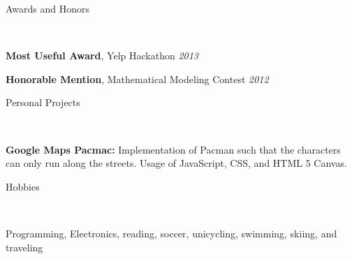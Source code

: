 \documentclass[9pt]{article}
\newenvironment{changemargin}[2]{%
  \begin{list}{}{%
    \setlength{\topsep}{0pt}%
    \setlength{\leftmargin}{#1}%
    \setlength{\rightmargin}{#2}%
    \setlength{\listparindent}{\parindent}%
    \setlength{\itemindent}{\parindent}%
    \setlength{\parsep}{\parskip}%
  }%
  \item[]}{\end{list}
}
\newcommand{\lineover}{
    \begin{changemargin}{-0.05in}{-0.05in}
        \vspace*{-8pt}
        \hrulefill \\
        \vspace*{-2pt}
    \end{changemargin}
}
\newcommand{\header}[1]{
    \begin{changemargin}{-0.5in}{-0.5in}
        {\large #1}\\
        \lineover
    \end{changemargin}
}
\newenvironment{body} {
    \vspace*{-16pt}
    \begin{changemargin}{-0.20in}{-0.5in}
  }
    {\end{changemargin}
}
\begin{document}
\smallskip


\header{Awards and Honors}

\begin{body}
    \vspace{14pt}

    \textbf{Most Useful Award}, Yelp Hackathon \hfill{} \emph{2013}\\
    \smallskip

    \textbf{Honorable Mention}, Mathematical Modeling Contest \hfill{} \emph{2012}\\

\end{body}
\smallskip


\header{Personal Projects}

\begin{body}
    \vspace{14pt}
    \textbf{Google Maps Pacmac:} Implementation of Pacman such that the characters can only run along the streets.  Usage of JavaScript, CSS, and HTML 5 Canvas.

\end{body}
\smallskip


\header{Hobbies}

\begin{body}
    \vspace{14pt}
    Programming, Electronics, reading, soccer, unicycling, swimming, skiing, and traveling
\end{body}
\end{document}

